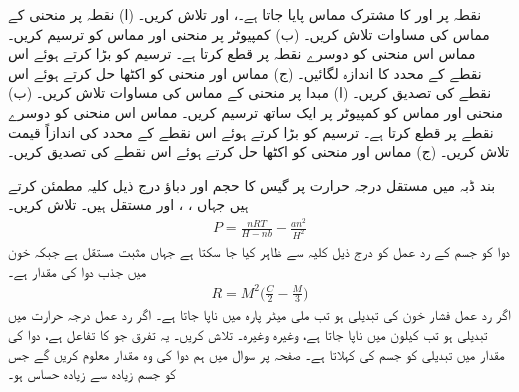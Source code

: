 نقطہ  پر  اور  کا مشترک مماس پایا جاتا ہے۔،  اور  تلاش کریں۔
(ا)  نقطہ  پر منحنی  کے مماس کی مساوات تلاش کریں۔ (ب) کمپیوٹر پر منحنی اور مماس کو ترسیم کریں۔  مماس اس منحنی کو دوسرے نقطہ پر قطع کرتا ہے۔ ترسیم کو بڑا کرتے ہوئے اس نقطے کے  محدد کا اندازہ لگائیں۔ (ج) مماس اور منحنی کو اکٹھا  حل کرتے ہوئے اس نقطے کی تصدیق کریں۔
(ا) مبدا پر منحنی  کے مماس کی مساوات تلاش کریں۔ (ب) منحنی اور مماس کو کمپیوٹر پر ایک ساتھ ترسیم کریں۔ مماس اس منحنی کو دوسرے نقطے پر  قطع کرتا ہے۔ ترسیم کو بڑا کرتے ہوئے اس نقطے کے محدد کی اندازاً قیمت تلاش کریں۔ (ج) مماس اور منحنی کو اکٹھا حل کرتے ہوئے  اس نقطے کی تصدیق کریں۔

\quad
بند ڈبہ میں مستقل درجہ حرارت  پر گیس کا حجم  اور دباؤ  درج ذیل کلیہ  مطمئن کرتے ہیں جہاں ، ،  اور  مستقل ہیں۔  تلاش کریں۔
\begin{align*}
P=\frac{nRT}{H-nb}-\frac{an^2}{H^2}
\end{align*}
\quad
دوا کو جسم کے رد عمل  کو  درج ذیل کلیہ  سے ظاہر کیا جا سکتا ہے جہاں  مثبت مستقل ہے جبکہ  خون میں جذب دوا کی مقدار ہے۔
\begin{align*}
R=M^2\big(\frac{C}{2}-\frac{M}{3}\big)
\end{align*}
اگر رد عمل فشار خون کی تبدیلی ہو تب  ملی  میٹر پارہ میں ناپا جاتا ہے۔ اگر رد عمل درجہ حرارت میں تبدیلی ہو تب    کیلون میں ناپا جاتا ہے، وغیرہ وغیرہ۔  تلاش کریں۔ یہ تفرق جو  کا تفاعل ہے،  دوا کی  مقدار میں تبدیلی کو جسم کی   کہلاتا ہے۔ صفحہ  پر  سوال  میں ہم دوا کی وہ مقدار معلوم کریں گے جس کو جسم  زیادہ سے زیادہ حساس ہو۔


